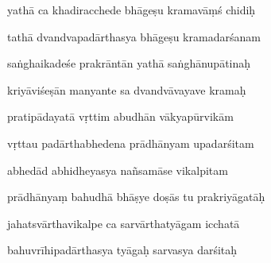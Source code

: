 \documentclass[article,12pt,a4paper]{memoir}%
\newcounter{parCount}
\begin{document}
	  
	  \pstart {} yathā ca khadiracchede bhāgeṣu kramavāṃś chidiḥ 
	{}
	\pend%
      

	  
	  \pstart \leavevmode%
	tathā dvandvapadārthasya bhāgeṣu kramadarśanam 
	{}
	\pend%
      

	  
	  \pstart {} saṅghaikadeśe prakrāntān yathā saṅghānupātinaḥ 
	{}
	\pend%
      

	  
	  \pstart \leavevmode%
	kriyāviśeṣān manyante sa dvandvāvayave kramaḥ 
	{}
	\pend%
      

	  
	  \pstart {} pratipādayatā vṛttim abudhān vākyapūrvikām 
	{}
	\pend%
      

	  
	  \pstart \leavevmode%
	vṛttau padārthabhedena prādhānyam upadarśitam 
	{}
	\pend%
      

	  
	  \pstart {} abhedād abhidheyasya nañsamāse vikalpitam 
	{}
	\pend%
      

	  
	  \pstart \leavevmode%
	prādhānyaṃ bahudhā bhāṣye doṣās tu prakriyāgatāḥ 
	{}
	\pend%
      

	  
	  \pstart {} jahatsvārthavikalpe ca sarvārthatyāgam icchatā 
	{}
	\pend%
      

	  
	  \pstart \leavevmode%
	bahuvrīhipadārthasya tyāgaḥ sarvasya darśitaḥ 
	{}
	\pend%
      
\end{document}

